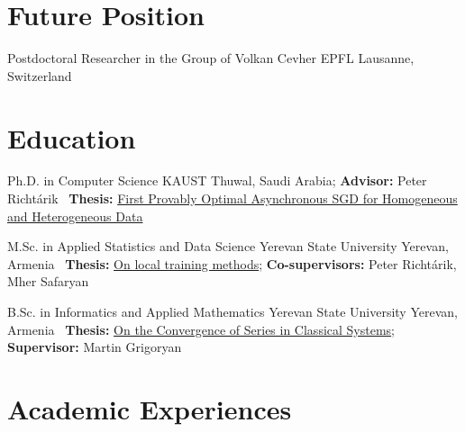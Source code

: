 \documentclass[10pt,a4paper,sans]{moderncv}        %
\newcommand{\peter}{Peter Richtárik}
\newcommand{\mher}{Mher Safaryan}
\newcommand{\grigoryan}{Martin Grigoryan}
\newcommand{\kaust}{KAUST}
\newcommand{\yerevan}{Yerevan, Armenia}
\newcommand{\thuwal}{Thuwal, Saudi Arabia}
\newcommand{\ysu}{Yerevan State University}
\begin{document}
\makecvtitle 



\section{Future Position}

{Postdoctoral Researcher in the Group of Volkan Cevher}
{EPFL}
{Lausanne, Switzerland}
{}{}


\section{Education}

{Ph.D. in Computer Science}
{\kaust}
{\thuwal; \textbf{Advisor:} \peter}{}
{\faFile \ \textbf{Thesis:} \href{https://arxiv.org/abs/2601.02523}{First Provably Optimal Asynchronous SGD for Homogeneous and Heterogeneous Data} }


{M.Sc. in Applied Statistics and Data Science}
{\ysu}
{\yerevan}{}
{\faFile \ \textbf{Thesis:} \href{https://artomaranjyan.github.io/assets/pdf/Master_thesis.pdf}{On local training methods}; \textbf{Co-supervisors:} \peter, \mher}


{B.Sc. in Informatics and Applied Mathematics}
{\ysu}
{\yerevan}{}
{\faFile \ \textbf{Thesis:} \href{https://artomaranjyan.github.io/assets/pdf/Bachelor_thesis.pdf}{On the Convergence of Series in Classical Systems}; \textbf{Supervisor:} \grigoryan}

\section{Academic Experiences}
\end{document}
